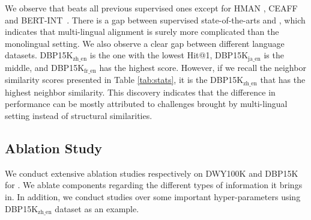 We observe that \solution beats all previous supervised ones except for HMAN \cite{yang2019aligning}, CEAFF~\cite{CEAFF} and BERT-INT~\cite{tang2019bert-int}. There is a gap between supervised state-of-the-arts and \solution, which indicates that multi-lingual alignment is surely more complicated than the monolingual setting. We also observe a clear gap between different language datasets. DBP15K$_{\text{zh\_en}}$ is the one with the lowest Hit@1, DBP15K$_{\text{ja\_en}}$ is the middle, and DBP15K$_{\text{fr\_en}}$ has the highest score. However, if we recall the neighbor similarity scores presented in Table \ref{tab:stats}, it is the DBP15K$_{\text{zh\_en}}$ that has the highest neighbor similarity. This discovery indicates that the difference in performance can be mostly attributed to challenges brought by multi-lingual setting instead of structural similarities. 








%

\subsection{Ablation Study} \label{sec:ablation}
We conduct extensive ablation studies respectively on DWY100K and DBP15K for \solution. We ablate components regarding the different types of information it brings in. In addition, we conduct studies over some important hyper-parameters using DBP15K$_{\text{zh\_en}}$ dataset as an example.
 
